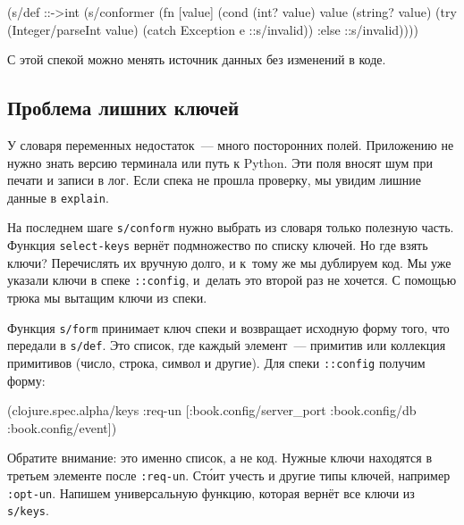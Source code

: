 \begin{english}
  \begin{clojure}
(s/def ::->int
  (s/conformer
   (fn [value]
     (cond
       (int? value) value
       (string? value)
       (try (Integer/parseInt value)
            (catch Exception e
              ::s/invalid))
       :else ::s/invalid))))
  \end{clojure}
\end{english}

\noindent
С этой спекой можно менять источник данных без изменений в коде.

\subsection{Проблема лишних ключей}

У словаря переменных недостаток~--- много посторонних полей. Приложению не нужно
знать версию терминала или путь к Python. Эти поля вносят шум при печати и
записи в лог. Если спека не прошла проверку, мы увидим лишние данные в
\verb|explain|.


На последнем шаге \verb|s/conform| нужно выбрать из словаря только полезную
часть. Функция \verb|select-keys| вернёт подмножество по списку ключей. Но где
взять ключи? Перечислять их вручную долго, и к~тому же мы дублируем код. Мы уже
указали ключи в спеке \verb|::config|, и~делать это второй раз не хочется. С
помощью трюка мы вытащим ключи из спеки.

Функция \verb|s/form| принимает ключ спеки и возвращает исходную форму того, что
передали в \verb|s/def|. Это список, где каждый элемент~--- примитив или
коллекция примитивов (число, строка, символ и другие). Для спеки \verb|::config|
получим форму:

\begin{english}
  \begin{clojure}
(clojure.spec.alpha/keys
 :req-un [:book.config/server_port
          :book.config/db
          :book.config/event])
  \end{clojure}
\end{english}


Обратите внимание: это именно список, а не код. Нужные ключи находятся в третьем
элементе после \verb|:req-un|. Ст\'{о}ит учесть и другие типы ключей, например
\verb|:opt-un|. Напишем универсальную функцию, которая вернёт все ключи из
\verb|s/keys|.

